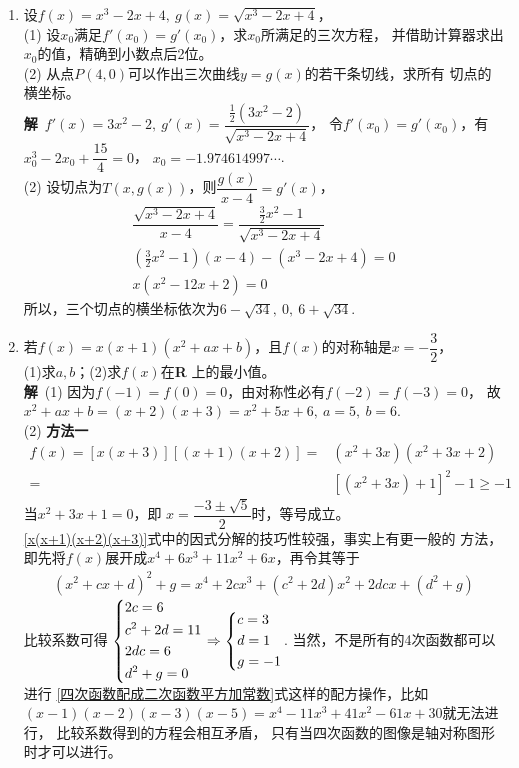 \begin{enumerate}[label={【\textbf{例\thechapter.\arabic*}】},
 leftmargin=\inteval{\myenumleftmargin}pt,
 itemsep=\inteval{\myenumitempsep}pt,
 itemindent=\inteval{\myenumitemindent}pt]
\item  设$ f(x)=x^3-2x+4,\ g(x)=\sqrt{x^3-2x+4} $，\\
(1) 设$ x_0 $满足$ f'(x_0)=g'(x_0) $，求$ x_0 $所满足的三次方程，
并借助计算器求出$x_0$的值，精确到小数点后2位。\\
(2) 从点$ P(4,0) $可以作出三次曲线$ y=g(x) $的若干条切线，求所有
切点的横坐标。\\
\textbf{解}\ $ f'(x)=3x^2-2,\ g'(x)=
\dfrac{\frac{1}{2}(3x^2-2)}{\sqrt{x^3-2x+4}} $，
令$ f'(x_0)=g'(x_0) $，有$ x_0^3-2x_0+\dfrac{15}{4}=0 $，
$x_0=-1.974614997\cdots $. \\
(2) 设切点为$ T(x,g(x)) $，则$ \dfrac{g(x)}{x-4}=g'(x) $，
\begin{gather*}
    \dfrac{\sqrt{x^3-2x+4}}{x-4}=
    \dfrac{\frac{3}{2}x^2-1}{\sqrt{x^3-2x+4}} \\
    \left(\frac{3}{2}x^2-1\right)(x-4)-(x^3-2x+4)=0 \\
    x(x^2-12x + 2)=0
\end{gather*}
所以，三个切点的横坐标依次为$ 6-\sqrt{34},\ 0,\ 6+\sqrt{34}$.

\item \label{四次函数的轴对称性}
若$ f(x)=x(x+1)(x^2+ax+b) $，且$ f(x) $的对称轴是$ x=
-\dfrac{3}{2} $，\\ (1)求$ a,b $；\quad (2)求$ f(x) $在\textbf{R}
上的最小值。\\
\textbf{解}\ (1) 因为$ f(-1)=f(0)=0 $，由对称性必有$ f(-2)=f(-3)=0 $，
故$ x^2+ax+b=(x+2)(x+3)=x^2+5x+6,\ a=5,\ b=6 $. \\
(2) \textbf{方法一}
\begin{align}\label{x(x+1)(x+2)(x+3)}
    f(x)=[x(x+3)][(x+1)(x+2)]=&(x^2+3x)(x^2+3x+2) \\
    =&[(x^2+3x)+1]^2-1 \geq -1 
\end{align}
当$ x^2+3x+1=0 $，即 $ x=\dfrac{-3\pm\sqrt{5}}{2} $时，等号成立。\\
\eqref{x(x+1)(x+2)(x+3)}式中的因式分解的技巧性较强，事实上有更一般的
方法，即先将$ f(x) $展开成$ x^4 + 6x^3 + 11x^2 + 6x $，再令其等于
\begin{gather}\label{四次函数配成二次函数平方加常数}
    (x^2+cx+d)^2+g=x^4+2cx^3+(c^2+2d)x^2+2dcx+(d^2+g) 
\end{gather}
比较系数可得
$ \begin{dcases}
    2c=6 \\
    c^2+2d=11 \\
    2dc=6 \\
    d^2+g=0
\end{dcases} \Rightarrow 
\begin{dcases}
    c=3 \\
    d=1\\
    g=-1
\end{dcases} $. 当然，不是所有的4次函数都可以进行
\eqref{四次函数配成二次函数平方加常数}式这样的配方操作，比如
$ (x-1)(x-2)(x-3)(x-5)=x^4-11x^3+41x^2-61x+30 $就无法进行，
比较系数得到的方程会相互矛盾，
只有当四次函数的图像是轴对称图形时才可以进行。


\end{enumerate}
